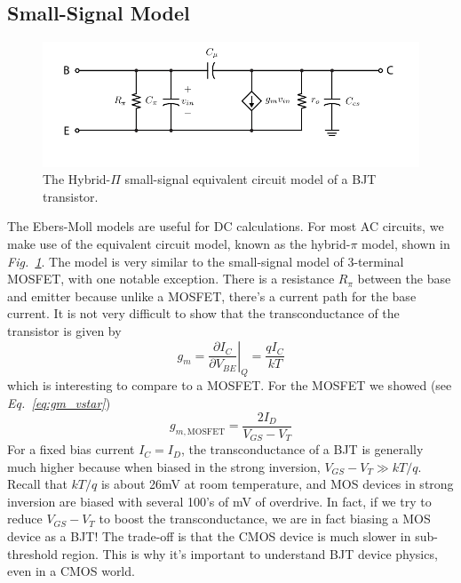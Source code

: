 \subsection{Small-Signal Model}
\begin{figure}[tb]
\centering
\includegraphics[scale=1]{bjt_hybridpi}
\caption{The Hybrid-$\Pi$ small-signal equivalent circuit model of a BJT transistor.} \label{fig:bjt_hybridpi}
\end{figure}
The Ebers-Moll models are useful for DC calculations.  For most AC circuits, we make use of the equivalent circuit model, known as the hybrid-$\pi$ model, shown in \emph{Fig.~\ref{fig:bjt_hybridpi}}.  The model is very similar to the small-signal model of 3-terminal MOSFET, with one notable exception.  There is a resistance $R_\pi$ between the base and emitter because unlike a MOSFET, there's a current path for the base current.  
It is not very difficult to show that the transconductance of the transistor is given by
    \begin{equation}
        g_m = \left. \frac{\partial I_C}{\partial V_{BE}} \right|_Q =  \frac{qI_C}{kT}
    \end{equation}
which is interesting to compare to a MOSFET.  For the MOSFET we showed (see \emph{Eq.~\ref{eq:gm_vstar}})
    \begin{equation}
        g_{m,\text{MOSFET}} = \frac{2 I_D}{V_{GS} - V_T}
    \end{equation}
For a fixed bias current $I_C = I_D$, the transconductance of a BJT is generally much higher because when biased in the strong inversion, $V_{GS} - V_T \gg kT/q$.  Recall that $kT/q$ is about 26mV at room temperature, and MOS devices in strong inversion are biased with several 100's of mV of overdrive.  In fact, if we try to reduce $V_{GS}-V_T$ to boost the transconductance, we are in fact biasing a MOS device as a BJT!  The trade-off is that the CMOS device is much slower in sub-threshold region.  This is why it's important to understand BJT device physics, even in a CMOS world.
